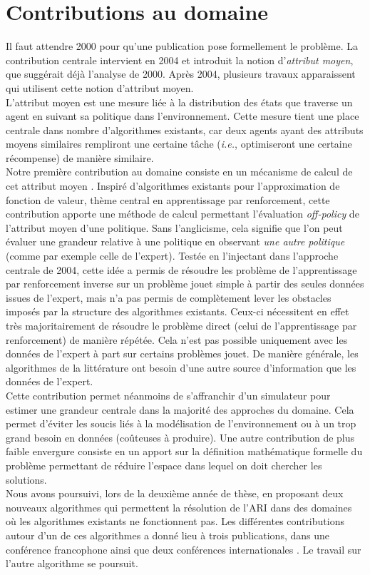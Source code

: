 \documentclass[11pt]{article}
\begin{document}
\section*{Contributions au domaine}
\label{sec-3}

  Il faut attendre 2000 pour qu'une publication pose formellement le problème. La contribution centrale intervient en 2004 et introduit la notion d'\emph{attribut moyen}, que suggérait déjà l'analyse de 2000. Après 2004, plusieurs travaux apparaissent qui utilisent cette notion d'attribut moyen.\\
  L'attribut moyen est une mesure liée à la distribution des états que traverse un agent en suivant sa politique dans l'environnement. Cette mesure tient une place centrale dans nombre d'algorithmes existants, car deux agents ayant des attributs moyens similaires rempliront une certaine tâche (\emph{i.e.}, optimiseront une certaine récompense) de manière similaire.\\

  Notre première contribution au domaine consiste en un mécanisme de calcul de cet attribut moyen \cite{klein2011batch}. Inspiré d'algorithmes existants pour l'approximation de fonction de valeur, thème central en apprentissage par renforcement, cette contribution apporte une méthode de calcul permettant l'évaluation \emph{off-policy} de l'attribut moyen d'une politique. Sans l'anglicisme, cela signifie que l'on peut évaluer une grandeur relative à une politique en observant \emph{une autre politique} (comme par exemple celle de l'expert). Testée en l'injectant dans l'approche centrale de 2004, cette idée a permis de résoudre les problème de l'apprentissage par renforcement inverse sur un problème jouet simple à partir des seules données issues de l'expert, mais n'a pas permis de complètement lever les obstacles imposés par la structure des algorithmes existants. Ceux-ci nécessitent en effet très majoritairement de résoudre le problème direct (celui de l'apprentissage par renforcement) de manière répétée. Cela n'est pas possible uniquement avec les données de l'expert à part sur certains problèmes jouet. De manière générale, les algorithmes de la littérature ont besoin d'une autre source d'information que les données de l'expert.\\
  Cette contribution permet néanmoins de s'affranchir d'un simulateur pour estimer une grandeur centrale dans la majorité des approches du domaine. Cela permet d'éviter les soucis liés à la modélisation de l'environnement ou à un trop grand besoin en données (coûteuses à produire).
  Une autre contribution de plus faible envergure consiste en un apport sur la définition mathématique formelle du problème \cite{klein2011dimensionality} permettant de réduire l'espace dans lequel on doit chercher les solutions.\\
  Nous avons poursuivi, lors de la deuxième année de thèse, en proposant deux nouveaux algorithmes qui permettent la résolution de l'ARI dans des domaines où les algorithmes existants ne fonctionnent pas. Les différentes contributions autour d'un de ces algorithmes a donné lieu à trois publications, dans une conférence francophone \cite{Supelec773} ainsi que deux conférences internationales \cite{klein2012,klein20122}. Le travail sur l'autre algorithme se poursuit.
\end{document}
